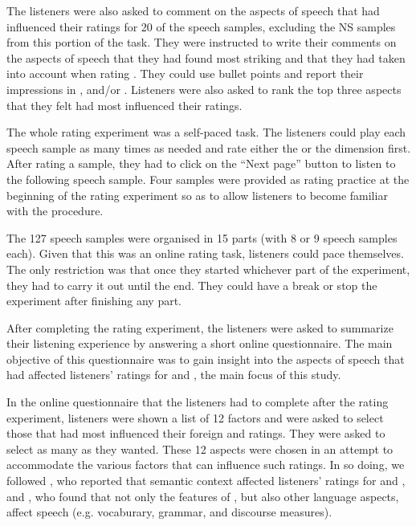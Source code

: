 \documentclass[output=paper]{langsci/langscibook}
\begin{document}
The listeners were also asked to comment on the aspects of speech that had influenced their  ratings for 20 of the speech samples, excluding the NS samples from this portion of the task. They were instructed to write their comments on the aspects of speech that they had found most striking and that they had taken into account when rating . They could use bullet points and report their impressions in ,  and/or . Listeners were also asked to rank the top three aspects that they felt had most influenced their  ratings.

The whole rating experiment was a self-paced task. The listeners could play each speech sample as many times as needed and rate either the  or the  dimension first. After rating a sample, they had to click on the “Next page” button to listen to the following speech sample. Four samples were provided as rating practice at the beginning of the rating experiment so as to allow listeners to become familiar with the procedure. 

The 127 speech samples were organised in 15 parts (with 8 or 9 speech samples each). Given that this was an online rating task, listeners could pace themselves. The only restriction was that once they started whichever part of the experiment, they had to carry it out until the end. They could have a break or stop the experiment after finishing any part. 

After completing the rating experiment, the listeners were asked to summarize their listening experience by answering a short online questionnaire. The main objective of this questionnaire was to gain insight into the aspects of speech that had affected listeners’ ratings for  and , the main focus of this study.

In the online questionnaire that the listeners had to complete after the rating experiment, listeners were shown a list of 12 factors and were asked to select those that had most influenced their foreign  and  ratings. They were asked to select as many as they wanted. These 12 aspects were chosen in an attempt to accommodate the various factors that can influence such ratings. In so doing, we followed \citet{KennedyTrofimovich2008}, who reported that semantic context affected listeners’ ratings for  and , and \citet{IsaacsTrofimovich2012}, who found that not only the  features of , but also other language aspects, affect speech  (e.g. vocaburary, grammar, and discourse measures).
\end{document}

